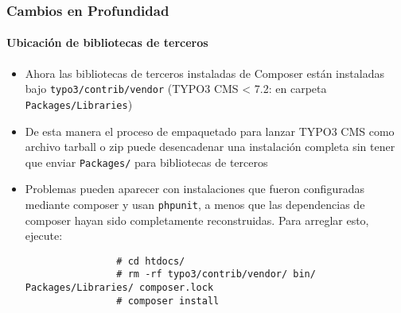 \begin{frame}[fragile]
	\frametitle{Cambios en Profundidad}
	\framesubtitle{Ubicación de bibliotecas de terceros}

	\begin{itemize}

		\item Ahora las bibliotecas de terceros instaladas de Composer están instaladas bajo \texttt{typo3/contrib/vendor}\newline
			\small
				(TYPO3 CMS < 7.2: en carpeta \texttt{Packages/Libraries})
			\normalsize

		\item De esta manera el proceso de empaquetado para lanzar TYPO3 CMS como archivo tarball o zip
			puede desencadenar una instalación completa sin tener que enviar \texttt{Packages/} para bibliotecas de terceros

		\item Problemas pueden aparecer con instalaciones que fueron configuradas mediante composer y usan \texttt{phpunit},
			a menos que las dependencias de composer hayan sido completamente reconstruidas. Para arreglar esto, ejecute:

			\begin{lstlisting}
				# cd htdocs/
				# rm -rf typo3/contrib/vendor/ bin/ Packages/Libraries/ composer.lock
				# composer install
			\end{lstlisting}
	\end{itemize}

\end{frame}


